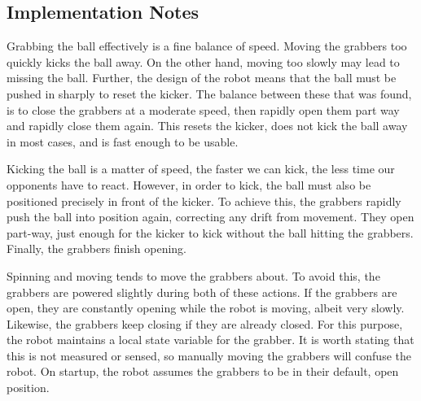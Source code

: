\subsection{Implementation Notes}

Grabbing the ball effectively is a fine balance of speed. Moving the grabbers
too quickly kicks the ball away. On the other hand, moving too slowly may lead
to missing the ball. Further, the design of the robot means that the ball must
be pushed in sharply to reset the kicker. The balance between these that was
found, is to close the grabbers at a moderate speed, then rapidly open them
part way and rapidly close them again. This resets the kicker, does not kick
the ball away in most cases, and is fast enough to be usable.

Kicking the ball is a matter of speed, the faster we can kick, the less time
our opponents have to react. However, in order to kick, the ball must also be
positioned precisely in front of the kicker. To achieve this, the grabbers
rapidly push the ball into position again, correcting any drift from movement.
They open part-way, just enough for the kicker to kick without the ball
hitting the grabbers. Finally, the grabbers finish opening.

Spinning and moving tends to move the grabbers about. To avoid this, the
grabbers are powered slightly during both of these actions. If the grabbers are
open, they are constantly opening while the robot is moving, albeit very
slowly. Likewise, the grabbers keep closing if they are already closed. For
this purpose, the robot maintains a local state variable for the grabber. It is
worth stating that this is not measured or sensed, so manually moving the
grabbers will confuse the robot. On startup, the robot assumes the grabbers to
be in their default, open position.
